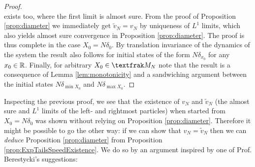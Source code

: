 \begin{proof}
\begin{equation}
\end{equation}
exists too, where the first limit is almost sure. From the proof of Proposition \ref{prop:diameter} we immediately get $\tilde{v}_N = v_N$ by uniqueness of $L^1$ limits, which also yields almost sure convergence in Proposition \ref{prop:diameter}. The proof is thus complete in the case $X_0 = N \delta_0$. By translation invariance of the dynamics of the system the result also follows for initial states of the form $N \delta_{x_0}$ for any $x_0 \in \mathbb{R}$. Finally, for arbitrary $X_0 \in \frak{M}_N$ note that the result is a consequence of Lemma \ref{lem:monotonicity} and a sandwiching argument between the initial states $N \delta_{\min X_0}$ and $N \delta_{\max X_0}$. 
\end{proof}


Inspecting the previous proof, we see that the existence of $v_N$ and $\tilde{v}_N$ (the almost sure and $L^1$ limits of the left- and rightmost particles) when started from $X_0 = N \delta_0$ was shown without relying on Proposition \ref{prop:diameter}. Therefore it might be possible to go the other way: if we can show that $v_N = \tilde{v}_N$ then we can \textit{deduce} Proposition \ref{prop:diameter} from Proposition \ref{prop:ExpTailsSpeedExistence}. We do so by an argument inspired by one of Prof. Berestycki's suggestions:

